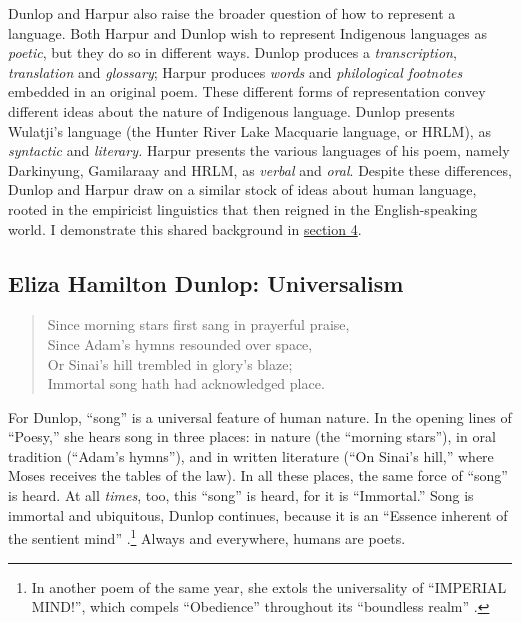 \documentclass[
  Crown,
  times,
  sageh]{sagej}
\begin{document}
Dunlop and Harpur also raise the broader question of how to represent a
language. Both Harpur and Dunlop wish to represent Indigenous languages
as \emph{poetic}, but they do so in different ways. Dunlop produces a
\emph{transcription}, \emph{translation} and \emph{glossary}; Harpur
produces \emph{words} and \emph{philological footnotes} embedded in an
original poem. These different forms of representation convey different
ideas about the nature of Indigenous language. Dunlop presents Wulatji's
language (the Hunter River Lake Macquarie language, or HRLM), as
\emph{syntactic} and \emph{literary.} Harpur presents the various
languages of his poem, namely Darkinyung, Gamilaraay and HRLM, as
\emph{verbal} and \emph{oral}. Despite these differences, Dunlop and
Harpur draw on a similar stock of ideas about human language, rooted in
the empiricist linguistics that then reigned in the English-speaking
world. I demonstrate this shared background in
\hyperref[linguistic-representation-and-the-conquest-of-space]{section
4}.

\subsection{Eliza Hamilton Dunlop:
Universalism}\label{eliza-hamilton-dunlop-universalism}

\begin{quote}
Since morning stars first sang in prayerful praise,\\
Since Adam's hymns resounded over space,\\
Or Sinai's hill trembled in glory's blaze;\\
Immortal song hath had acknowledged place. \citep[ll.
1-4]{dunlop_poesy_1872}
\end{quote}

For Dunlop, ``song'' is a universal feature of human nature. In the
opening lines of ``Poesy,'' she hears song in three places: in nature
(the ``morning stars''), in oral tradition (``Adam's hymns''), and in
written literature (``On Sinai's hill,'' where Moses receives the tables
of the law). In all these places, the same force of ``song'' is heard.
At all \emph{times}, too, this ``song'' is heard, for it is
``Immortal.'' Song is immortal and ubiquitous, Dunlop continues, because
it is an ``Essence inherent of the sentient mind'' \citep[l.
5]{dunlop_poesy_1872}.\footnote{In another poem of the same year, she
  extols the universality of ``IMPERIAL MIND!'', which compels
  ``Obedience'' throughout its ``boundless realm''
  \citeyearpar{dunlop_mind_1872}.} Always and everywhere, humans are
poets.
\end{document}
